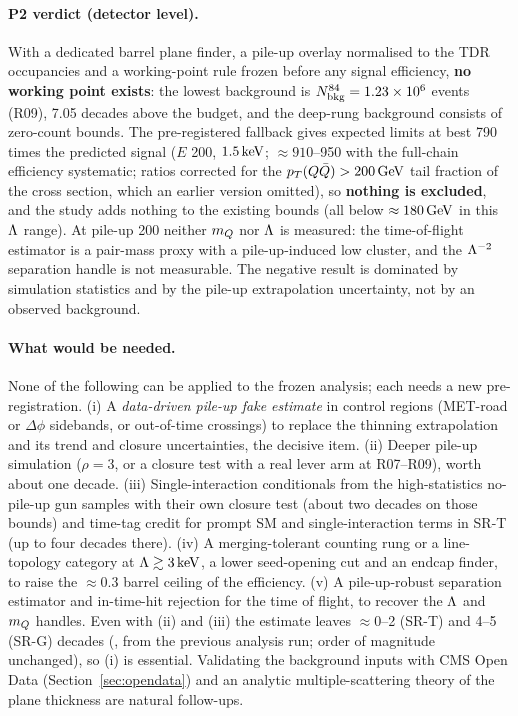 \paragraph{P2 verdict (detector level).} With a dedicated barrel plane finder, a pile-up overlay normalised to the TDR
occupancies and a working-point rule frozen before any signal efficiency, \textbf{no working point exists}: the lowest
background is $N_{\rm bkg}^{84}=1.23\times10^6$ events (R09), 7.05 decades above the budget, and the deep-rung background
consists of zero-count bounds. The pre-registered fallback gives expected limits at best 790 times the predicted signal
($E$ 200, $1.5\,\mathrm{keV}$; $\approx910$--950 with the full-chain efficiency systematic; ratios corrected for the
$p_T(Q\bar Q)>200\,\mathrm{GeV}$ tail fraction of the cross section, which an earlier version omitted), so \textbf{nothing is excluded}, and the
study adds nothing to the existing bounds (all below $\approx180\,\mathrm{GeV}$ in this $\Lambda$ range). At pile-up 200 neither $m_Q$ nor
$\Lambda$ is measured: the time-of-flight estimator is a pair-mass proxy with a pile-up-induced low cluster, and the
$\Lambda^{-2}$ separation handle is not measurable. The negative result is dominated by simulation statistics and by the
pile-up extrapolation uncertainty, not by an observed background.

\paragraph{What would be needed.} None of the following can be applied to the frozen analysis; each needs a new
pre-registration. (i) A \emph{data-driven pile-up fake estimate} in control regions (MET-road or $\Delta\phi$ sidebands, or
out-of-time crossings) to replace the thinning extrapolation and its trend and closure uncertainties, the decisive item.
(ii) Deeper pile-up simulation ($\rho=3$, or a closure test with a real lever arm at R07--R09), worth about one decade.
(iii) Single-interaction conditionals from the high-statistics no-pile-up gun samples with their own closure test (about two
decades on those bounds) and time-tag credit for prompt SM and single-interaction terms in SR-T (up to four decades there).
(iv) A merging-tolerant counting rung or a line-topology category at $\Lambda\gtrsim3\,\mathrm{keV}$, a lower seed-opening cut and an
endcap finder, to raise the $\approx0.3$ barrel ceiling of the efficiency. (v) A pile-up-robust separation estimator and
in-time-hit rejection for the time of flight, to recover the $\Lambda$ and $m_Q$ handles. Even with (ii) and (iii) the estimate
leaves $\approx0$--2 (SR-T) and 4--5 (SR-G) decades (\EST{}, from the previous analysis run; order of magnitude
unchanged), so (i) is essential. Validating the background inputs with
CMS Open Data (Section~\ref{sec:opendata}) and an analytic multiple-scattering theory of the plane thickness are natural
follow-ups.
